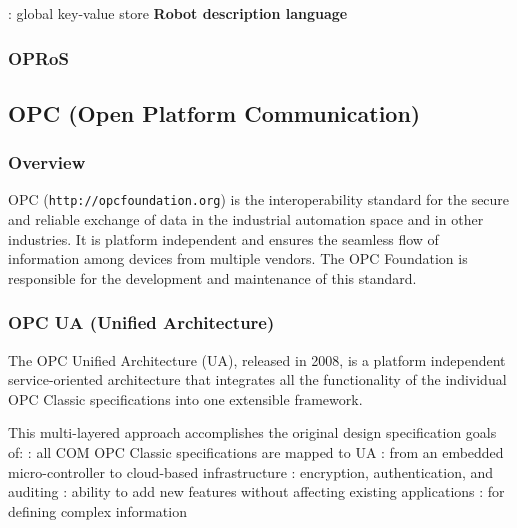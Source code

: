 \documentclass{myproc}
\begin{document}
   \w {}: global key-value store
   \eit
\w \textcolor{red2}{\bf Robot description language}
\w {}
\eit
\subsubsection{OPRoS}

\subsection{\textcolor{red2}{\bf{}OPC (Open Platform Communication)}}
\subsubsection{Overview}
OPC (\texttt{http://opcfoundation.org}) is the interoperability
standard for the secure and reliable exchange of data in the industrial
automation space and in other industries. It is platform independent and
ensures the seamless flow of information among devices from multiple
vendors. The OPC Foundation is responsible for the development and maintenance
of this standard.

\subsubsection{OPC UA (Unified Architecture)}
The OPC Unified Architecture (UA), released in 2008, is a platform independent
service-oriented architecture that integrates all the functionality of the
individual OPC Classic specifications into one extensible framework. 

This multi-layered approach accomplishes the original design specification
goals of: 
\bit
\w {}: all COM OPC Classic specifications are mapped
to UA 
\w {}: from an embedded micro-controller to
cloud-based infrastructure 
\w {}: encryption, authentication, and auditing
\w {}: ability to add new features without affecting existing
applications 
\w {}: for defining complex information
\eit
\end{document}
